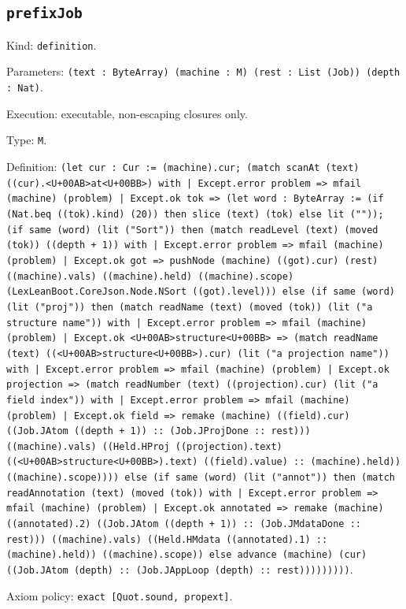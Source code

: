 \documentclass[11pt]{article}
\begin{document}
\subsection*{\texttt{prefixJob}}
\noindent Kind: \texttt{definition}.\par
\noindent Parameters: \texttt{(text : ByteArray) (machine : M) (rest : List (Job)) (depth : Nat)}.\par
\noindent Execution: executable, non-escaping closures only.\par
\noindent Type: \texttt{M}.\par
\noindent Definition: \texttt{(let cur : Cur := (machine).cur; (match scanAt (text) ((cur).<U+00AB>at<U+00BB>) with | Except.error problem => mfail (machine) (problem) | Except.ok tok => (let word : ByteArray := (if (Nat.beq ((tok).kind) (20)) then slice (text) (tok) else lit ("")); (if same (word) (lit ("Sort")) then (match readLevel (text) (moved (tok)) ((depth + 1)) with | Except.error problem => mfail (machine) (problem) | Except.ok got => pushNode (machine) ((got).cur) (rest) ((machine).vals) ((machine).held) ((machine).scope) (LexLeanBoot.CoreJson.Node.NSort ((got).level))) else (if same (word) (lit ("proj")) then (match readName (text) (moved (tok)) (lit ("a structure name")) with | Except.error problem => mfail (machine) (problem) | Except.ok <U+00AB>structure<U+00BB> => (match readName (text) ((<U+00AB>structure<U+00BB>).cur) (lit ("a projection name")) with | Except.error problem => mfail (machine) (problem) | Except.ok projection => (match readNumber (text) ((projection).cur) (lit ("a field index")) with | Except.error problem => mfail (machine) (problem) | Except.ok field => remake (machine) ((field).cur) ((Job.JAtom ((depth + 1)) :: (Job.JProjDone :: rest))) ((machine).vals) ((Held.HProj ((projection).text) ((<U+00AB>structure<U+00BB>).text) ((field).value) :: (machine).held)) ((machine).scope)))) else (if same (word) (lit ("annot")) then (match readAnnotation (text) (moved (tok)) with | Except.error problem => mfail (machine) (problem) | Except.ok annotated => remake (machine) ((annotated).2) ((Job.JAtom ((depth + 1)) :: (Job.JMdataDone :: rest))) ((machine).vals) ((Held.HMdata ((annotated).1) :: (machine).held)) ((machine).scope)) else advance (machine) (cur) ((Job.JAtom (depth) :: (Job.JAppLoop (depth) :: rest)))))))))}.\par
\noindent Axiom policy: \texttt{exact [Quot.sound, propext]}.\par
\end{document}
